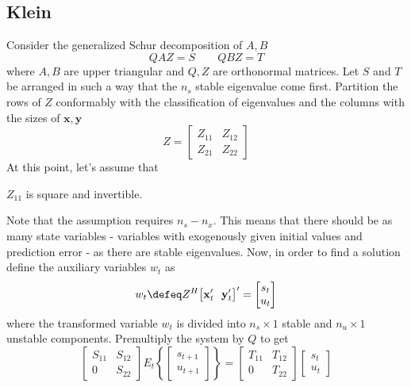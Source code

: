 \documentclass[a4paper,10pt]{article}  %
\begin{document}
\subsection{Klein} %
\label{sub:klein}

Consider the generalized Schur decomposition of $ A, B $ 
\begin{equation}
   Q A Z = S \qquad Q B Z = T
\end{equation}
where $ A,B $ are upper triangular and $ Q,Z$ are orthonormal matrices. Let $ S $ and $ T $ be arranged in such a way
that the $ n_s $ stable eigenvalue come first. Partition the rows of $ Z $ conformably with the classification of
eigenvalues and the columns with the sizes of $ \mathbf{x},\mathbf{y} $
\begin{equation*}
   Z = 
   \begin{bmatrix}
      Z_{11} & Z_{12} \\ Z_{21} & Z_{22}
   \end{bmatrix}
\end{equation*}
At this point, let's assume that
\begin{assump}
   $ Z_{11} $ is square and invertible. 
\end{assump}
Note that the assumption requires $n_s - n_x$. This means that there should be as many state variables - variables with
exogenously given initial values and prediction error - as there are stable eigenvalues. Now, in order to find a
solution define the auxiliary variables $ w_t $ as
\begin{equation}
   \label{eq:aux}
   w_t \defeq Z^{H} \big[ \mathbf{x}_t' \ \  \mathbf{y}_t' \big]' =
   \begin{bmatrix}
      s_t \\ u_t
   \end{bmatrix}
\end{equation}
where the transformed variable $ w_t $ is divided into $ n_s\times 1 $ stable and $ n_u \times 1 $ unstable components. 
Premultiply the system by $ Q $ to get 
\begin{equation}
   \begin{bmatrix}
      S_{11} & S_{12} \\ 0 & S_{22}
   \end{bmatrix}
   E_t \left\{
   \begin{bmatrix}
      s_{t+1} \\ u_{t+1}
   \end{bmatrix} \right\}
    = 
    \begin{bmatrix}
       T_{11} & T_{12} \\ 0 & T_{22}
    \end{bmatrix}
    \begin{bmatrix}
      s_{t} \\ u_{t}
   \end{bmatrix}
\end{equation}
\end{document}
